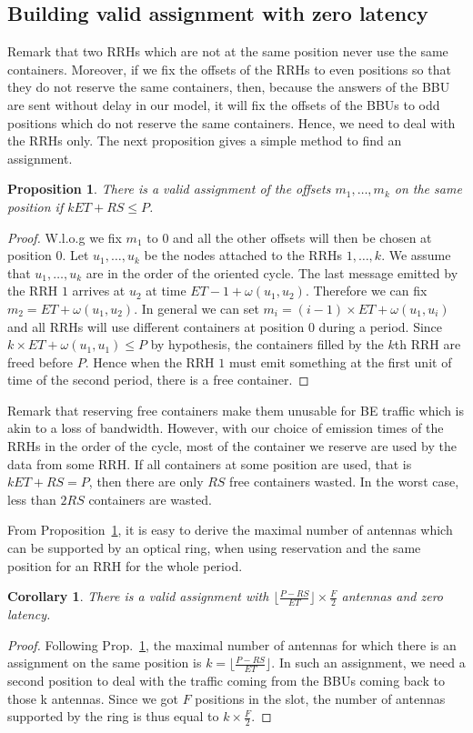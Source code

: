 \documentclass[10pt, conference, letterpaper]{IEEEtran}
\newtheorem{prop}{Proposition}
\newtheorem{corollary}{Corollary}
\begin{document}
 \subsection{Building valid assignment with zero latency}
Remark that two RRHs which are not at the same position never use the same containers. Moreover, if we fix the offsets of the RRHs to even positions so that they do not reserve the same containers, then, because the answers of the BBU are sent without delay in our model, it will fix the offsets of the BBUs to odd positions which do not reserve the same containers. Hence, we need to deal with the RRHs only.
The next proposition gives a simple method to find an assignment.

\begin{prop}
\label{prop:assign}
There is a valid assignment of the offsets $m_1, \dots, m_k$ on the same position if  $k ET + RS \leq P$.
\end{prop}
\begin{proof}
 W.l.o.g we fix $m_1$ to $0$ and all the other offsets will then be chosen at position $0$.  Let $u_1,\dots,u_k$ be the nodes attached to the RRHs $1,\dots,k$. We assume that $u_1,\dots,u_k$ are in the order of the oriented cycle. The last message emitted by the RRH $1$ arrives at $u_2$ at time $ET - 1 + \omega(u_1,u_2)$. Therefore we can fix $m_2 =  ET  + \omega(u_1,u_2)$. In general we can set $m_i = (i-1) \times ET + \omega(u_1,u_i)$ and all RRHs will use different containers at position $0$ during a period. Since $k \times ET + \omega(u_1,u_1) \leq P$ by hypothesis,
 the containers filled by the $k$th RRH are freed before $P$. Hence when the RRH $1$ must emit something at the first unit of time of the second period, there is a free container.
\end{proof}

Remark that reserving free containers make them unusable for BE traffic which is akin to a loss of bandwidth. However, with our choice of emission times of the RRHs in the order of the cycle, most of the container we reserve are used by the data from some RRH. If all containers at some position are used, that is $kET +RS = P$, then there are only $RS$ free containers wasted. In the worst case, less than $2RS$ containers are wasted. 

From Proposition~\ref{prop:assign}, it is easy to derive the maximal number of antennas which can be supported by an optical ring, when using reservation and the same position for an RRH for the whole period.

\begin{corollary}
There is a valid assignment with $ \lfloor\frac{P- RS}{ET}\rfloor \times \frac{F}{2}$ antennas and zero latency.
\end{corollary}
\begin{proof}
Following Prop.~\ref{prop:assign}, the maximal number of antennas for which there is an assignment on the same position is $k = \lfloor\frac{P- RS}{ET}\rfloor $.
In such an assignment, we need a second position to deal with the traffic coming from the BBUs coming back to those k antennas. Since we got  $F$ positions in the slot, the number of antennas supported by the ring is thus equal to $k \times \frac{F}{2}$.
\end{proof}
\end{document}
